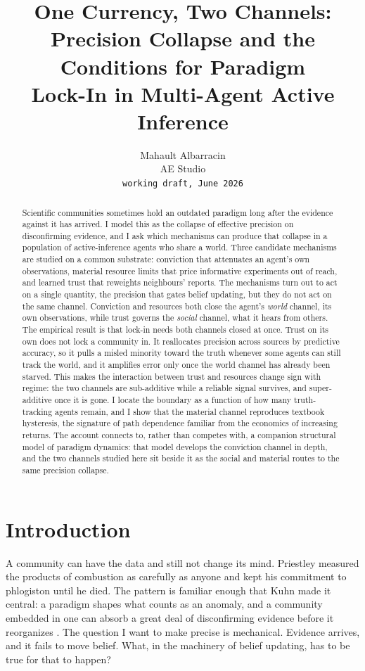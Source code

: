 \documentclass[11pt]{article}
\title{\textbf{One Currency, Two Channels:\\
Precision Collapse and the Conditions for Paradigm\\ Lock-In in Multi-Agent Active Inference}}
\author{Mahault Albarracin\\
\small AE Studio\\
\small \texttt{working draft, June 2026}}
\date{}
\begin{document}
\maketitle

\begin{abstract}
Scientific communities sometimes hold an outdated paradigm long after the
evidence against it has arrived. I model this as the collapse of effective
precision on disconfirming evidence, and I ask which mechanisms can produce
that collapse in a population of active-inference agents who share a world.
Three candidate mechanisms are studied on a common substrate: conviction that
attenuates an agent's own observations, material resource limits that price
informative experiments out of reach, and learned trust that reweights
neighbours' reports. The mechanisms turn out to act on a single quantity, the
precision that gates belief updating, but they do not act on the same channel.
Conviction and resources both close the agent's \emph{world} channel, its own
observations, while trust governs the \emph{social} channel, what it hears from
others. The empirical result is that lock-in needs both channels closed at
once. Trust on its own does not lock a community in. It reallocates precision
across sources by predictive accuracy, so it pulls a misled minority toward the
truth whenever some agents can still track the world, and it amplifies error
only once the world channel has already been starved. This makes the
interaction between trust and resources change sign with regime: the two
channels are sub-additive while a reliable signal survives, and super-additive
once it is gone. I locate the boundary as a function of how many truth-tracking
agents remain, and I show that the material channel reproduces textbook
hysteresis, the signature of path dependence familiar from the economics of
increasing returns. The account connects to, rather than competes with, a
companion structural model of paradigm dynamics: that model develops the
conviction channel in depth, and the two channels studied here sit beside it as
the social and material routes to the same precision collapse.
\end{abstract}

\section{Introduction}

A community can have the data and still not change its mind. Priestley measured
the products of combustion as carefully as anyone and kept his commitment to
phlogiston until he died. The pattern is familiar enough that Kuhn made it
central: a paradigm shapes what counts as an anomaly, and a community embedded
in one can absorb a great deal of disconfirming evidence before it
reorganizes \citep{kuhn1962Structure}. The question I want to make precise is
mechanical. Evidence arrives, and it fails to move belief. What, in the
machinery of belief updating, has to be true for that to happen?
\end{document}
